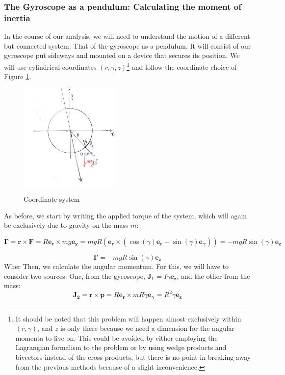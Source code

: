 \documentclass[a4paper,12pt]{article}
\begin{document}
\subsubsection{The Gyroscope as a pendulum: Calculating the moment of inertia}

In the course of our analysis, we will need to understand the motion of a different but connected system: That of the gyroscope as a pendulum. It will consist of our gyroscope put sideways and mounted on a device that secures its position. We will use cylindrical coordinates $(r,\gamma,z)$\footnote{It should be noted that this problem will happen almost exclusively within $(r,\gamma)$, and $z$ is only there because we need a dimension for the angular momenta to live on. This could be avoided by either employing the Lagrangian formalism to the problem or by using wedge products and bivectors instead of the cross-products, but there is no point in breaking away from the previous methods because of a slight inconvenience.} and follow the coordinate choice of Figure \ref{cordinate}.

\begin{figure}[h!]
	\centering
	\caption{Coordinate system}
	\includegraphics[width=5cm]{coord2.jpg}
	\label{cordinate}
\end{figure} 

As before, we start by writing the applied torque of the system, which will again be exclusively due to gravity on the mass $m$:

\begin{equation*}
	\boldsymbol{\Gamma} = \boldsymbol{r} \times \boldsymbol{F} = R \boldsymbol{e_r} \times mg \boldsymbol{e_y} = mgR\left(\boldsymbol{e_r} \times \left(\cos(\gamma)\boldsymbol{e_r} - \sin(\gamma) \boldsymbol{e_\gamma}\right)\right) = -mgR \sin(\gamma) \boldsymbol{e_z}
\end{equation*}

\begin{equation}
	\label{torque2}
	\boldsymbol{\Gamma} = -mgR \sin(\gamma) \boldsymbol{e_z}
\end{equation}
Wher
Then, we calculate the angular momentum. For this, we will have to consider two sources: One, from the gyroscope, $\boldsymbol{J_1} = I \dot{\gamma} \boldsymbol{e_z}$, and the other from the mass:
$$\boldsymbol{J_2} = \boldsymbol{r} \times \boldsymbol{p} = R \boldsymbol{e_r} \times mR \dot{\gamma} \boldsymbol{e_\gamma} = R^2 \dot{\gamma} \boldsymbol{e_z}$$
\end{document}
